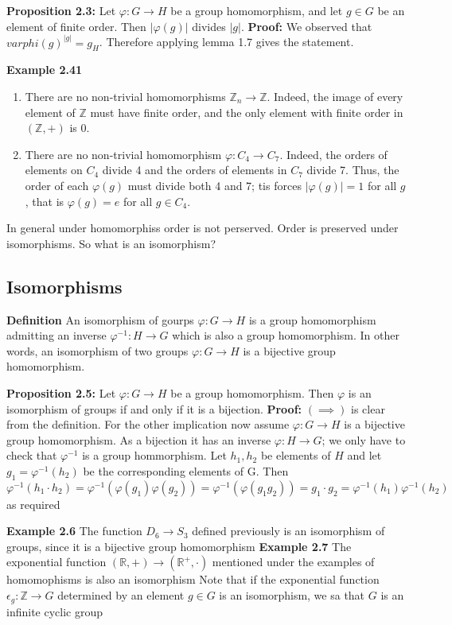\textbf{Proposition 2.3:} Let $\varphi : G \to H$ be a group homomorphism, and let $g \in G$ be an element of finite order. Then $|\varphi(g)|$ divides $|g|$.
\textbf{Proof:} We observed that $varphi(g)^{|g|} = g_H$. Therefore applying lemma 1.7 gives the statement.

\textbf{Example 2.41}
\begin{enumerate}
    \item There are no non-trivial homomorphisms $\mathbb{Z}_n \to \mathbb{Z}$. Indeed, the image of every element of $\mathbb{Z}$ must have finite order, and the only element with finite order in $(\mathbb{Z}, +)$ is $0$.
    \item There are no non-trivial homomorphism $\varphi : C_4 \to C_7$. Indeed, the orders of elements on $C_4$ divide 4 and the orders of elements in $C_7$ divide 7. Thus, the order of each $\varphi(g)$ must divide both 4 and 7; tis forces $|\varphi(g)| = 1$ for all $g$, that is $\varphi(g) = e$ for all $g \in C_4$.
\end{enumerate}
In general under homomorphiss order is not perserved. Order is preserved under isomorphisms. So what is an isomorphism?


\subsection*{Isomorphisms}
\textbf{Definition} An isomorphism of gourps $\varphi : G \to  H $ is a group homomorphism admitting an inverse $\varphi^{-1} : H \to G$ which is also a group homomorphism. In other words, an isomorphism of two groups $\varphi : G \to H$  is a bijective group homomorphism.

\textbf{Proposition 2.5:} Let $\varphi : G \to H$ be a group homomorphism. Then $\varphi$ is an isomorphism of groups if and only if it is a bijection.
\textbf{Proof:} $(\implies)$ is clear from the definition. For the other implication now assume $\varphi : G \to H$ is a bijective group homomorphism. As a bijection it has an inverse $\varphi : H \to G$; we only have to check that $\varphi^{-1}$ is a group hommorphism. Let $h_1,h_2 $ be elements of $H$ and let $g_1 = \varphi^{-1}(h_2)$ be the corresponding
 elements of G. Then
 $$\varphi^{-1}(h_1 \cdot h_2 ) = \varphi^{-1}(\varphi(g_1)\varphi(g_2)) = \varphi^{-1}(\varphi(g_1g_2)) = g_1 \cdot g_2 = \varphi^{-1}(h_1)\varphi^{-1}(h_2)
 $$
as required

\textbf{Example 2.6} The function $D_6 \to S_3$ defined previously is an isomorphism of groups, since it is  a bijective group homomorphism
\textbf{Example 2.7} The exponential function $(\mathbb{R},+) \to (\mathbb{R^+},\cdot)$ mentioned under the examples of homomophisms is also an isomorphism
Note that if the exponential function $\epsilon_g : \mathbb{Z} \to G$ determined by an element $g \in G$ is an isomorphism, we sa that $G$ is an infinite cyclic group

